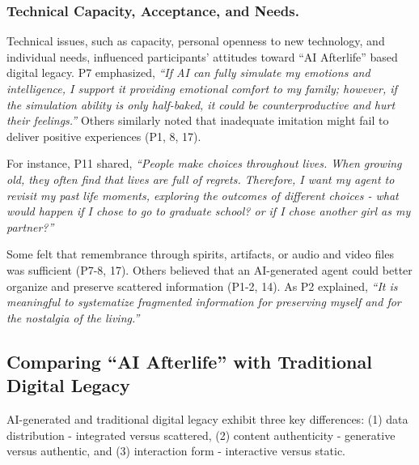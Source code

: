 \subsubsection{Technical Capacity, Acceptance, and Needs.}

Technical issues, such as capacity, personal openness to new technology, and individual needs, influenced participants' attitudes toward ``AI Afterlife'' based digital legacy. 
 P7 emphasized, \textit{``If AI can fully simulate my emotions and intelligence, I support it providing emotional comfort to my family; however, if the simulation ability is only half-baked, it could be counterproductive and hurt their feelings.''} Others similarly noted that inadequate imitation might fail to deliver positive experiences (P1, 8, 17).

 For instance, P11 shared, \textit{``People make choices throughout lives. When growing old, they often find that lives are full of regrets. Therefore, I want my agent to revisit my past life moments, exploring the outcomes of different choices - what would happen if I chose to go to graduate school? or if I chose another girl as my partner?''}

 Some felt that remembrance through spirits, artifacts, or audio and video files was sufficient (P7-8, 17). Others believed that an AI-generated agent could better organize and preserve scattered information (P1-2, 14). As P2 explained, \textit{``It is meaningful to systematize fragmented information for preserving myself and for the nostalgia of the living.''}

\subsection{Comparing ``AI Afterlife'' with Traditional Digital Legacy}\label{comparision ai and traditional}

AI-generated and traditional digital legacy exhibit three key differences: (1) data distribution - integrated versus scattered, (2) content authenticity - generative versus authentic, and (3) interaction form - interactive versus static.

